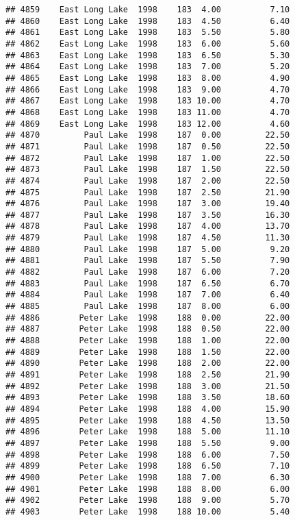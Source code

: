 \documentclass[
]{article}
\begin{document}
\begin{verbatim}
## 4859    East Long Lake  1998    183  4.00          7.10
## 4860    East Long Lake  1998    183  4.50          6.40
## 4861    East Long Lake  1998    183  5.50          5.80
## 4862    East Long Lake  1998    183  6.00          5.60
## 4863    East Long Lake  1998    183  6.50          5.30
## 4864    East Long Lake  1998    183  7.00          5.20
## 4865    East Long Lake  1998    183  8.00          4.90
## 4866    East Long Lake  1998    183  9.00          4.70
## 4867    East Long Lake  1998    183 10.00          4.70
## 4868    East Long Lake  1998    183 11.00          4.70
## 4869    East Long Lake  1998    183 12.00          4.60
## 4870         Paul Lake  1998    187  0.00         22.50
## 4871         Paul Lake  1998    187  0.50         22.50
## 4872         Paul Lake  1998    187  1.00         22.50
## 4873         Paul Lake  1998    187  1.50         22.50
## 4874         Paul Lake  1998    187  2.00         22.50
## 4875         Paul Lake  1998    187  2.50         21.90
## 4876         Paul Lake  1998    187  3.00         19.40
## 4877         Paul Lake  1998    187  3.50         16.30
## 4878         Paul Lake  1998    187  4.00         13.70
## 4879         Paul Lake  1998    187  4.50         11.30
## 4880         Paul Lake  1998    187  5.00          9.20
## 4881         Paul Lake  1998    187  5.50          7.90
## 4882         Paul Lake  1998    187  6.00          7.20
## 4883         Paul Lake  1998    187  6.50          6.70
## 4884         Paul Lake  1998    187  7.00          6.40
## 4885         Paul Lake  1998    187  8.00          6.00
## 4886        Peter Lake  1998    188  0.00         22.00
## 4887        Peter Lake  1998    188  0.50         22.00
## 4888        Peter Lake  1998    188  1.00         22.00
## 4889        Peter Lake  1998    188  1.50         22.00
## 4890        Peter Lake  1998    188  2.00         22.00
## 4891        Peter Lake  1998    188  2.50         21.90
## 4892        Peter Lake  1998    188  3.00         21.50
## 4893        Peter Lake  1998    188  3.50         18.60
## 4894        Peter Lake  1998    188  4.00         15.90
## 4895        Peter Lake  1998    188  4.50         13.50
## 4896        Peter Lake  1998    188  5.00         11.10
## 4897        Peter Lake  1998    188  5.50          9.00
## 4898        Peter Lake  1998    188  6.00          7.50
## 4899        Peter Lake  1998    188  6.50          7.10
## 4900        Peter Lake  1998    188  7.00          6.30
## 4901        Peter Lake  1998    188  8.00          6.00
## 4902        Peter Lake  1998    188  9.00          5.70
## 4903        Peter Lake  1998    188 10.00          5.40

\end{verbatim}
\end{document}
